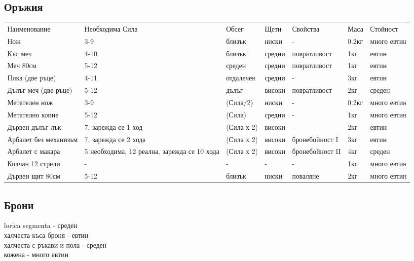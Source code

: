 \subsection{Оръжия}
\begin{tabular}{p{2cm} | p{2cm} | p{2cm} | p{2cm} | p{2cm} | p{2cm} | p{2cm}}
Наименование          & Необходима Сила      & Обсег      & Щети       & Свойства       & Маса  & Стойност         \\
Нож                   & 3-9                  & близък     & ниски      & -              & 0.2кг & много евтин  \\
Къс меч               & 4-10                 & близък     & средни     & повратливост   & 1кг   & евтин        \\
Меч 80см              & 5-12                 & среден     & средни     & повратливост   & 1кг   & евтин        \\

Пика (две ръце)       & 4-11                 & отдалечен  & средни     & -              & 3кг   & евтин        \\
Дълъг меч (две ръце)  & 5-12                 & дълъг      & високи     & повратливост   & 2кг   & среден       \\

Метателен нож         & 3-9                  & (Сила/2)   & ниски      & -              & 0.2кг & много евтин  \\
Метателно копие       & 5-12                 & (Сила)     & средни     & -              & 1кг   & много евтин  \\
Дървен дълъг лък      & 7, зарежда се 1 ход  & (Сила х 2) & високи     & -              & 2кг   & евтин        \\
Арбалет без механизъм & 7, зарежда се 2 хода & (Сила х 2) & високи     & бронебойност I & 3кг   & евтин        \\
Арбалет с макара      & 5 необходима, 12 реална, зарежда се 10 хода & (Сила х 2) & високи & бронебойност II & 4кг & среден\\
Колчан 12 стрели      & -                    & -          & -          & -              & 1кг   & много евтин  \\

Дървен щит 80см       & 5-12                 & близък     & ниски      & поваляне       & 2кг   & много евтин  \\
\end{tabular}

\subsection{Брони}
lorica segmenta - среден  \\
халчеста къса броня - евтин \\
халчеста с ръкави и пола - среден \\
кожена - много евтин

